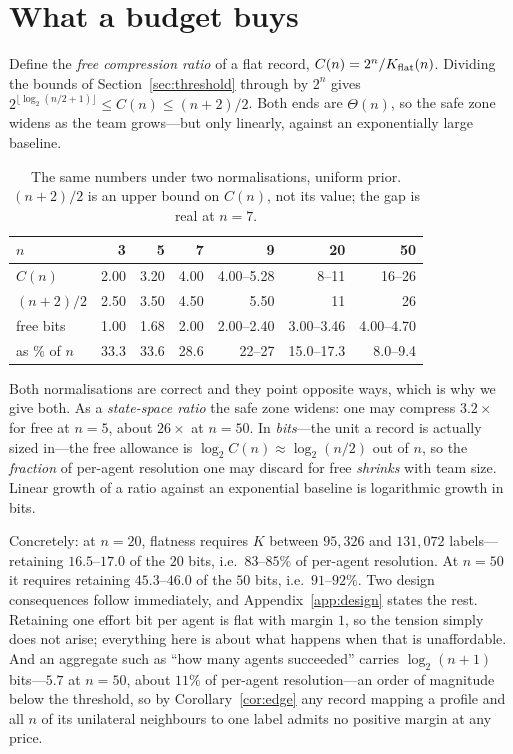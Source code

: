 \section{What a budget buys}
\label{sec:agents}

Define the \emph{free compression ratio} of a flat record,
$C(n) = 2^n / K_{\mathrm{flat}}(n)$. Dividing the bounds of Section~\ref{sec:threshold}
through by $2^n$ gives
$2^{\lfloor \log_2(n/2+1)\rfloor} \le C(n) \le (n+2)/2$. Both ends are
$\Theta(n)$, so the safe zone widens as the team grows---but only linearly,
against an exponentially large baseline.

\begin{table}[t]
\centering
\caption{The same numbers under two normalisations, uniform prior. $(n+2)/2$ is
an upper bound on $C(n)$, not its value; the gap is real at $n=7$.}
\label{tab:ratio}
\small
\begin{tabular}{@{}lrrrrrr@{}}
\toprule
$n$ & 3 & 5 & 7 & 9 & 20 & 50 \\
\midrule
$C(n)$        & 2.00 & 3.20 & 4.00 & 4.00--5.28 & 8--11 & 16--26 \\
$(n+2)/2$     & 2.50 & 3.50 & 4.50 & 5.50 & 11 & 26 \\
free bits     & 1.00 & 1.68 & 2.00 & 2.00--2.40 & 3.00--3.46 & 4.00--4.70 \\
as \% of $n$  & 33.3 & 33.6 & 28.6 & 22--27 & 15.0--17.3 & 8.0--9.4 \\
\bottomrule
\end{tabular}
\end{table}

Both normalisations are correct and they point opposite ways, which is why we
give both. As a \emph{state-space ratio} the safe zone widens: one may compress
$3.2\times$ for free at $n=5$, about $26\times$ at $n=50$. In \emph{bits}---the
unit a record is actually sized in---the free allowance is
$\log_2 C(n) \approx \log_2(n/2)$ out of $n$, so the \emph{fraction} of per-agent
resolution one may discard for free \emph{shrinks} with team size. Linear growth
of a ratio against an exponential baseline is logarithmic growth in bits.

Concretely: at $n = 20$, flatness requires $K$ between $95{,}326$ and
$131{,}072$ labels---retaining $16.5$--$17.0$ of the $20$ bits, i.e.\ $83$--$85\%$
of per-agent resolution. At $n = 50$ it requires retaining $45.3$--$46.0$ of the
$50$ bits, i.e.\ $91$--$92\%$. Two design consequences follow immediately, and
Appendix~\ref{app:design} states the rest. Retaining one effort bit per agent is
flat with margin $1$, so the tension simply does not arise; everything here is
about what happens when that is unaffordable. And an aggregate such as ``how many
agents succeeded'' carries $\log_2(n+1)$ bits---$5.7$ at $n = 50$, about $11\%$
of per-agent resolution---an order of magnitude below the threshold, so by
Corollary~\ref{cor:edge} any record mapping a profile and all $n$ of its
unilateral neighbours to one label admits no positive margin at any price.

